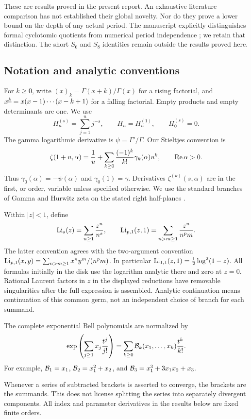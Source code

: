 These are results proved in the present report. An exhaustive literature
comparison has not established their global novelty. Nor do they prove
a lower bound on the depth of any actual period. The manuscript explicitly
distinguishes formal cyclotomic quotients from numerical period
independence \cite{repo:quotients}; we retain that distinction. The short
$S_6$ and $S_8$ identities remain outside the results proved here.

\subsection{Notation and analytic conventions}
For $k\geq0$, write $(x)_k=\Gamma(x+k)/\Gamma(x)$ for a rising
factorial, and $x^{\underline{k}}=x(x-1)\cdots(x-k+1)$ for a falling factorial.
Empty products and empty determinants are one. We use
\[
 H_n^{(s)}=\sum_{j=1}^n j^{-s},\qquad H_n=H_n^{(1)},\qquad H_0^{(s)}=0.
\]
The gamma logarithmic derivative is $\psi=\Gamma'/\Gamma$. Our
Stieltjes convention is
\begin{equation}\label{dhr:eq:stieltjes-convention}
 \zeta(1+u,\alpha)=\frac1u+
 \sum_{k\geq0}\frac{(-1)^k}{k!}\gamma_k(\alpha)u^k,
 \qquad \operatorname{Re}\alpha>0.
\end{equation}
Thus $\gamma_0(\alpha)=-\psi(\alpha)$ and $\gamma_0(1)=\gamma$.
Derivatives $\zeta^{(k)}(s,\alpha)$ are in the first, or order,
variable unless specified otherwise. We use the standard branches of
Gamma and Hurwitz zeta on the stated right half-planes
\cite{dlmf:gamma,dlmf:hurwitz,dlmf:polygamma}.

Within $|z|<1$, define
\begin{equation}\label{dhr:eq:polylogs}
 \operatorname{Li}_s(z)=\sum_{n\geq1}\frac{z^n}{n^s},\qquad
 \operatorname{Li}_{p,1}(z,1)=\sum_{n>m\geq1}\frac{z^n}{n^pm}.
\end{equation}
The latter convention agrees with the two-argument convention
$\operatorname{Li}_{p,1}(x,y)=\sum_{n>m\geq1}x^ny^m/(n^pm)$.
In particular $\operatorname{Li}_{1,1}(z,1)=\tfrac12\log^2(1-z)$. All formulas
initially in the disk use the logarithm analytic there and zero at
$z=0$. Rational Laurent factors in $z$ in the displayed reductions
have removable singularities after the full expression is assembled.
Analytic continuation means continuation of this common germ, not an
independent choice of branch for each summand.

The complete exponential Bell polynomials are normalized by
\begin{equation}\label{dhr:eq:bell}
 \exp\left(\sum_{j\geq1}x_j\frac{t^j}{j!}\right)
 =\sum_{k\geq0}\mathcal B_k(x_1,\ldots,x_k)\frac{t^k}{k!}.
\end{equation}
For example, $\mathcal B_1=x_1$, $\mathcal B_2=x_1^2+x_2$, and
$\mathcal B_3=x_1^3+3x_1x_2+x_3$.

Whenever a series of subtracted brackets is asserted to converge,
the brackets are the summands. This does not license splitting the
series into separately divergent components. All index and parameter
derivatives in the results below are fixed finite orders.
